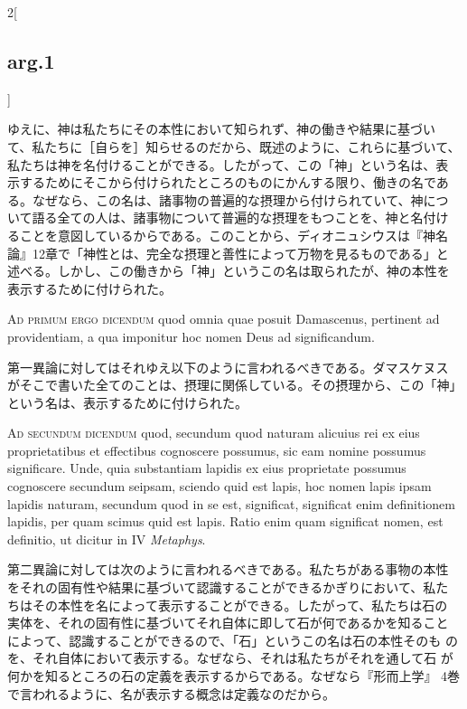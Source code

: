 \documentclass[paper=a4paper,fontsize=10pt,jafontsize=9pt,titlepage]{jlreq}
\begin{document}
\begin{paracol}{2}[\subsection{arg.1}]
\switchcolumn

ゆえに、神は私たちにその本性において知られず、神の働きや結果に基づい
て、私たちに［自らを］知らせるのだから、既述のように、これらに基づいて、
私たちは神を名付けることができる。したがって、この「神」という名は、表
示するためにそこから付けられたところのものにかんする限り、働きの名であ
る。なぜなら、この名は、諸事物の普遍的な摂理から付けられていて、神につ
いて語る全ての人は、諸事物について普遍的な摂理をもつことを、神と名付け
ることを意図しているからである。このことから、ディオニュシウスは『神名
論』12章で「神性とは、完全な摂理と善性によって万物を見るものである」と
述べる。しかし、この働きから「神」というこの名は取られたが、神の本性を
表示するために付けられた。

\switchcolumn*[\subsection{ad.1}]

{\scshape Ad primum ergo dicendum} quod omnia quae posuit Damascenus,
pertinent ad providentiam, a qua imponitur hoc nomen Deus ad
significandum.

\switchcolumn

第一異論に対してはそれゆえ以下のように言われるべきである。ダマスケヌス
がそこで書いた全てのことは、摂理に関係している。その摂理から、この「神」
という名は、表示するために付けられた。

\switchcolumn*[\subsection{ad.2}]

{\scshape Ad secundum dicendum} quod, secundum quod naturam alicuius
rei ex eius proprietatibus et effectibus cognoscere possumus, sic eam
nomine possumus significare. Unde, quia substantiam lapidis ex eius
proprietate possumus cognoscere secundum seipsam, sciendo quid est
lapis, hoc nomen lapis ipsam lapidis naturam, secundum quod in se est,
significat, significat enim definitionem lapidis, per quam scimus quid
est lapis.  Ratio enim quam significat nomen, est definitio, ut
dicitur in IV {\itshape Metaphys}.

\switchcolumn

第二異論に対しては次のように言われるべきである。私たちがある事物の本性
をそれの固有性や結果に基づいて認識することができるかぎりにおいて、私た
ちはその本性を名によって表示することができる。したがって、私たちは石の
実体を、それの固有性に基づいてそれ自体に即して石が何であるかを知ること
によって、認識することができるので、「石」というこの名は石の本性そのも
のを、それ自体において表示する。なぜなら、それは私たちがそれを通して石
が何かを知るところの石の定義を表示するからである。なぜなら『形而上学』
4巻で言われるように、名が表示する概念は定義なのだから。


\end{paracol}
\end{document}
